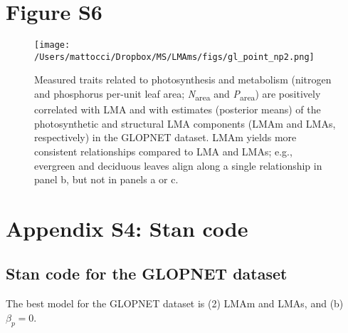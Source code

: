 \documentclass[
  12pt,
  letterpaper,
  DIV=11,
  numbers=noendperiod]{scrartcl}
\begin{document}
\newpage

\hypertarget{figure-s6}{%
\section{Figure S6}\label{figure-s6}}

\begin{figure}

{\centering \texttt{[image: /Users/mattocci/Dropbox/MS/LMAms/figs/gl\_point\_np2.png]}

}

\caption{\label{fig-gl_point_np2}Measured traits related to
photosynthesis and metabolism (nitrogen and phosphorus per-unit leaf
area; \emph{N}\textsubscript{area} and \emph{P}\textsubscript{area}) are
positively correlated with LMA and with estimates (posterior means) of
the photosynthetic and structural LMA components (LMAm and LMAs,
respectively) in the GLOPNET dataset. LMAm yields more consistent
relationships compared to LMA and LMAs; e.g., evergreen and deciduous
leaves align along a single relationship in panel b, but not in panels a
or c.}

\end{figure}

\hypertarget{appendix-s4-stan-code}{%
\section{Appendix S4: Stan code}\label{appendix-s4-stan-code}}

\hypertarget{stan-code-for-the-glopnet-dataset}{%
\subsection{Stan code for the GLOPNET
dataset}\label{stan-code-for-the-glopnet-dataset}}

The best model for the GLOPNET dataset is (2) LMAm and LMAs, and (b)
\(\beta_p = 0\).
\end{document}
